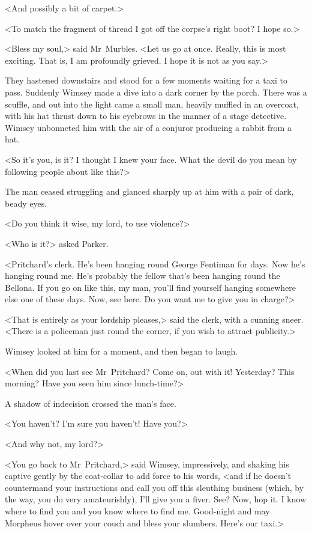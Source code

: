 <And possibly a bit of carpet.>

<To match the fragment of thread I got off the corpse's right boot? I hope so.>

<Bless my soul,> said Mr~Murbles. <Let us go at once. Really, this is most exciting. That is, I am profoundly grieved. I hope it is not as you say.>

They hastened downstairs and stood for a few moments waiting for a taxi to pass. Suddenly Wimsey made a dive into a dark corner by the porch. There was a scuffle, and out into the light came a small man, heavily muffled in an overcoat, with his hat thrust down to his eyebrows in the manner of a stage detective. Wimsey unbonneted him with the air of a conjuror producing a rabbit from a hat.

<So it's you, is it? I thought I knew your face. What the devil do you mean by following people about like this?>

The man ceased struggling and glanced sharply up at him with a pair of dark, beady eyes.

<Do you think it wise, my lord, to use violence?>

<Who is it?> asked Parker.

<Pritchard's clerk. He's been hanging round George Fentiman for days. Now he's hanging round me. He's probably the fellow that's been hanging round the Bellona. If you go on like this, my man, you'll find yourself hanging somewhere else one of these days. Now, see here. Do you want me to give you in charge?>

<That is entirely as your lordship pleases,> said the clerk, with a cunning sneer. <There is a policeman just round the corner, if you wish to attract publicity.>

Wimsey looked at him for a moment, and then began to laugh.

<When did you last see Mr~Pritchard? Come on, out with it! Yesterday? This morning? Have you seen him since lunch-time?>

A shadow of indecision crossed the man's face.

<You haven't? I'm sure you haven't! Have you?>

<And why not, my lord?>

<You go back to Mr~Pritchard,> said Wimsey, impressively, and shaking his captive gently by the coat-collar to add force to his words, <and if he doesn't countermand your instructions and call you off this sleuthing business (which, by the way, you do very amateurishly), I'll give you a fiver. See? Now, hop it. I know where to find you and you know where to find me. Good-night and may Morpheus hover over your couch and bless your slumbers. Here's our taxi.>

